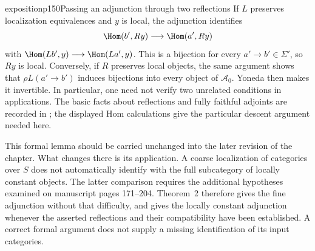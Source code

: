 \begin{dcomment}{exposition}{p150}{Passing an adjunction through two reflections}
If $L$ preserves localization equivalences and $y$ is local, the adjunction identifies
\[
 \Hom(b',Ry)\longrightarrow\Hom(a',Ry)
\]
with $\Hom(Lb',y)\longrightarrow\Hom(La',y)$. This is a bijection for every $a'\longrightarrow b'\in\Sigma'$, so $Ry$ is local. Conversely, if $R$ preserves local objects, the same argument shows that $\rho L(a'\longrightarrow b')$ induces bijections into every object of $\mathcal A_0$. Yoneda then makes it invertible. In particular, one need not verify two unrelated conditions in applications. The basic facts about reflections and fully faithful adjoints are recorded in \citet[Lemma~4.5.11 and Definition~4.5.12]{Riehl2016}; the displayed Hom calculations give the particular descent argument needed here.

This formal lemma should be carried unchanged into the later revision of the chapter. What changes there is its application. A coarse localization of categories over $S$ does not automatically identify with the full subcategory of locally constant objects. The latter comparison requires the additional hypotheses examined on manuscript pages 171--204. Theorem~2 therefore gives the fine adjunction without that difficulty, and gives the locally constant adjunction whenever the asserted reflections and their compatibility have been established. A correct formal argument does not supply a missing identification of its input categories.
\end{dcomment}

